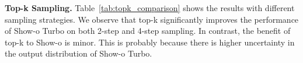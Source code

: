 
\noindent \textbf{Top-k Sampling.} 
Table~\ref{tab:topk_comparison} shows the results with different sampling strategies.
We observe that top-k significantly improves the performance of Show-o Turbo on both 2-step and 4-step sampling.
In contrast, the benefit of top-k to Show-o is minor. 
This is probably because there is higher uncertainty in the output distribution of Show-o Turbo. 

